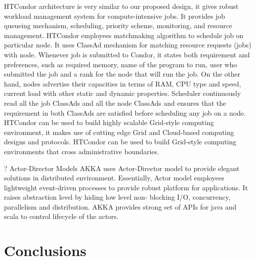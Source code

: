 \documentclass[sigconf]{acmart}
\begin{document}
HTCondor \cite{htcondor} architecture is very similar to our proposed design, it gives robust workload management system for compute-intensive jobs. It provides job queueing mechanism, scheduling, priority scheme, monitoring, and resource management.
HTCondor employees matchmaking algorithm to schedule job on particular node. It uses ClassAd mechanism for matching resource requests (jobs) with node. Whenever job is submitted to Condor, it states both requirement and preferences, such as required memory, name of the program to run, user who submitted the job and a rank for the node that will run the job. On the other hand, nodes advertise their capacities in terms of RAM, CPU type and speed, current load with other static and dynamic properties.
Scheduler continuously read all the job ClassAds and all the node ClassAds and ensures that the requirement in both ClassAds are satisfied before scheduling any job on a node. HTCondor can be used to build highly scalable Grid-style computing environment, it makes use of cutting edge Grid and Cloud-based computing designs and protocols.
HTCondor can be used to build Grid-style computing environments that cross administrative boundaries. 

?	 Actor-Director Models
AKKA uses Actor-Director model to provide elegant solutions in distributed environment. Essentially, Actor model employees lightweight event-driven processes to provide robust platform for applications. It raises abstraction level by hiding low level non- blocking I/O, concurrency, parallelism and distribution. AKKA provides strong set of APIs for java and scala to control lifecycle of the actors. 

\subsection{}

\section{Conclusions}
\end{document}
